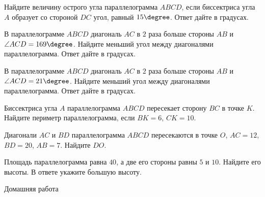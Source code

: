 \begin{class}[number=3]
\begin{listofex}
		\item Найдите величину острого угла параллелограмма \( ABCD \), если биссектриса угла \( A \) образует со стороной \( DC \) угол, равный \( 15\degree \). Ответ дайте в градусах.
		\item В параллелограмме \( ABCD \) диагональ \( AC \) в \( 2 \) раза больше стороны \( AB \) и \( \angle ACD=169\degree \). Найдите меньший угол между диагоналями параллелограмма. Ответ дайте в градусах.
		\item В параллелограмме \( ABCD \) диагональ \( AC \) в \( 2 \) раза больше стороны \( AB \) и \( \angle ACD=21\degree \). Найдите меньший угол между диагоналями параллелограмма. Ответ дайте в градусах.
		\item Биссектриса угла \( A \) параллелограмма \( ABCD \) пересекает сторону \( BC \) в точке \( K \). Найдите периметр параллелограмма, если \( BK=6 \), \( CK=10 \).
		\item Диагонали \( AC \) и \( BD \) параллелограмма \( ABCD \) пересекаются в точке \( O \), \( AC=12 \), \( BD=20 \), \( AB=7 \). Найдите \( DO \).
		\item Площадь параллелограмма равна \( 40 \), а две его стороны равны \( 5 \) и \( 10 \). Найдите его высоты. В ответе укажите большую высоту.
	\end{listofex}
\end{class}

\begin{homework}[number=3]
	\begin{listofex}
		\item Домашняя работа
	\end{listofex}
\end{homework}

